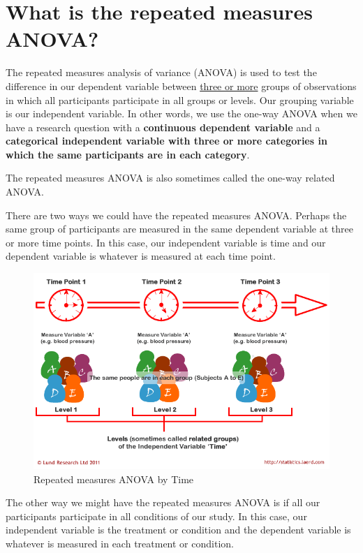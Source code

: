 \documentclass[
]{book}
\begin{document}
\hypertarget{what-is-the-repeated-measures-anova}{%
\section{What is the repeated measures ANOVA?}\label{what-is-the-repeated-measures-anova}}

The repeated measures analysis of variance (ANOVA) is used to test the difference in our dependent variable between \underline{three or more} groups of observations in which all participants participate in all groups or levels. Our grouping variable is our independent variable. In other words, we use the one-way ANOVA when we have a research question with a \textbf{continuous dependent variable} and a \textbf{categorical independent variable with three or more categories in which the same participants are in each category}.

The repeated measures ANOVA is also sometimes called the one-way related ANOVA.

There are two ways we could have the repeated measures ANOVA. Perhaps the same group of participants are measured in the same dependent variable at three or more time points. In this case, our independent variable is time and our dependent variable is whatever is measured at each time point.

\begin{figure}

{\centering \includegraphics[width=0.8\linewidth]{images/05-repeated-measures-anova/Laerd1} 

}

\caption{Repeated measures ANOVA by Time}\label{fig:unnamed-chunk-1}
\end{figure}

The other way we might have the repeated measures ANOVA is if all our participants participate in all conditions of our study. In this case, our independent variable is the treatment or condition and the dependent variable is whatever is measured in each treatment or condition.
\end{document}
